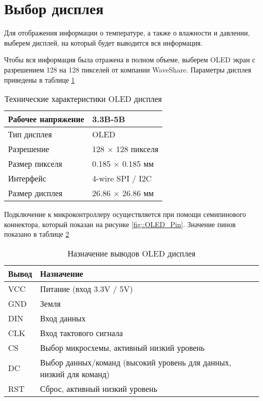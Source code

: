 \section {Выбор дисплея}

Для отображения информации о температуре, а также о влажности и давлении, выберем дисплей, на который будет выводится вся информация. 

Чтобы вся информация была отражена в полном объеме, выберем OLED экран с разрешением 128 на 128 пикселей от компании WaveShare. Параметры дисплея приведены в таблице \ref{tab::specifications}

\begin{table}[h!]
	\centering
	\caption{Технические характеристики OLED дисплея}
	\begin{tabular}{| m{7cm} | m{7cm} |}
		\hline
		Рабочее напряжение & 3.3B-5B \\ \hline
		Тип дисплея & OLED \\ \hline
		Разрешение & 128 × 128 пикселя \\ \hline
		Размер пикселя & 0.185 × 0.185 мм \\ \hline
		Интерфейс & 4-wire SPI / I2C \\ \hline
		Размер дисплея & 26.86 × 26.86 мм \\ \hline
	\end{tabular}
	
	\label{tab::specifications}
\end{table}

Подключение к микроконтроллеру осуществляется при помощи семипинового коннектора, который показан на рисунке \ref{fig::OLED_Pin}. Значение пинов показано в таблице \ref{tab::pinout}


\begin{table}[htb]
	\centering
	\begin{tabular}{| m{2cm} | m{10cm} |}
		\hline
		\textbf{Вывод} & \textbf{Назначение} \\ \hline
		VCC & Питание (вход 3.3V / 5V) \\ \hline
		GND & Земля \\ \hline
		DIN & Вход данных \\ \hline
		CLK & Вход тактового сигнала \\ \hline
		CS & Выбор микросхемы, активный низкий уровень \\ \hline
		DC & Выбор данных/команд (высокий уровень для данных, низкий для команд) \\ \hline
		RST & Сброс, активный низкий уровень \\ \hline
		\end{tabular}
	\caption{Назначение выводов OLED дисплея}
	\label{tab::pinout}
\end{table}

